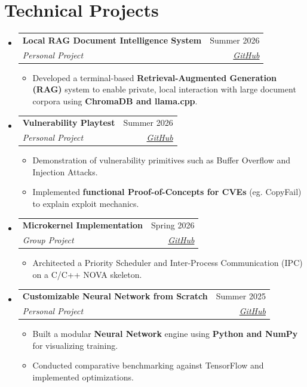 \documentclass[a4paper,11pt]{article}
\makeatletter
\newcommand{\headingFour}[4]{
	\item
	\begin{tabular*}{0.97\textwidth}{l@{\extracolsep{\fill}}r}
	\textbf{\large\textcolor{customBlue}{#1}} & {#2} \\
	\textit{#3} & \textit{#4} \\
	\end{tabular*}\vspace{-6pt}
}
\makeatother
\begin{document}
\section{Technical Projects}
\begin{itemize}[leftmargin=*]
\headingFour{Local RAG Document Intelligence System}{Summer 2026}
{Personal Project}{\href{https://github.com/John-Popovici/doc-rag}{GitHub}}
\begin{itemize}
	\item{Developed a terminal-based \textbf{Retrieval-Augmented Generation (RAG)} system to enable private, local interaction with large document corpora using \textbf{ChromaDB and llama.cpp}.}\vspace{-2pt}
\end{itemize}

\headingFour{Vulnerability Playtest}{Summer 2026}
{Personal Project}{\href{https://github.com/John-Popovici/vulnerability-playtest}{GitHub}}
\begin{itemize}
	\item{Demonstration of vulnerability primitives such as Buffer Overflow and Injection Attacks.}\vspace{-2pt}
	\item{Implemented \textbf{functional Proof-of-Concepts for CVEs} (eg. CopyFail) to explain exploit mechanics.}\vspace{-2pt}
\end{itemize}

\headingFour{Microkernel Implementation}{Spring 2026}
{Group Project}{\href{https://github.com/John-Popovici/Microkernel_Implementation}{GitHub}}
\begin{itemize}
	\item{Architected a Priority Scheduler and Inter-Process Communication (IPC) on a C/C++ NOVA skeleton.}\vspace{-2pt}
\end{itemize}

\headingFour{Customizable Neural Network from Scratch}{Summer 2025}
{Personal Project}{\href{https://github.com/John-Popovici/scratch-neural-network?tab=readme-ov-file\#custom-neural-network-from-scratch}{GitHub}}
\begin{itemize}
	\item{Built a modular \textbf{Neural Network} engine using \textbf{Python and NumPy} for visualizing training.}\vspace{-2pt}
	\item{Conducted comparative benchmarking against TensorFlow and implemented optimizations.}\vspace{-2pt}
\end{itemize}


\end{itemize}
\end{document}
